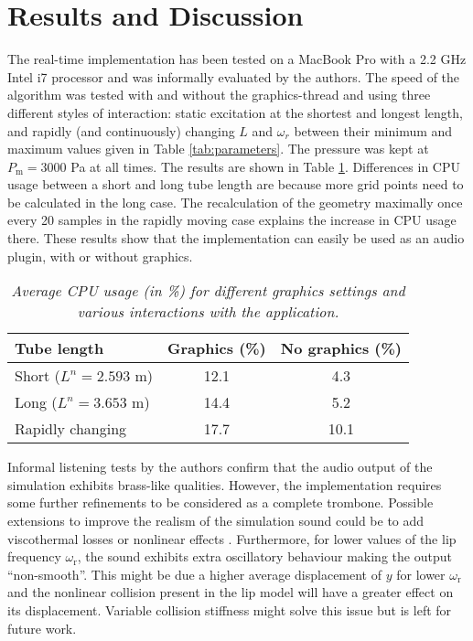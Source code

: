 \section{Results and Discussion}\label{sec:resDisc}
The real-time implementation has been tested on a MacBook Pro with a 2.2 GHz Intel i7 processor and was informally evaluated by the authors. The speed of the algorithm was tested with and without the graphics-thread and using three different styles of interaction: static excitation at the shortest and longest length, and rapidly (and continuously) changing $L$ and $\omega_r$ between their minimum and maximum values given in Table \ref{tab:parameters}. The pressure was kept at $P_\text{m} = 3000$ Pa at all times. The results are shown in Table \ref{tab:CPU}. Differences in CPU usage between a short and long tube length are because more grid points need to be calculated in the long case. The recalculation of the geometry maximally once every 20 samples in the rapidly moving case explains the increase in CPU usage there. %
These results show that the implementation can easily be used as an audio plugin, with or without graphics.
\begin{table}[ht]
    \small
    \begin{center}
    \caption{\it Average CPU usage (in \%) for different graphics settings and various interactions with the application. \label{tab:CPU}}
    \begin{tabular}{|l|c|c|}
        \hline
        Tube length & Graphics (\%) & No graphics (\%)\\\hline
        Short ($L^n = 2.593$ m) & 12.1 & 4.3\\
        Long ($L^n = 3.653$ m) & 14.4 & 5.2 
        \\
        Rapidly changing & 17.7 & 10.1\\\hline    \end{tabular}
    \end{center}
\end{table}

Informal listening tests by the authors confirm that the audio output of the simulation exhibits brass-like qualities. However, the implementation requires some further refinements to be considered as a complete trombone. Possible extensions to improve the realism of the simulation sound could be to add viscothermal losses \cite{Harrison2016} or nonlinear effects \cite{msallam1997physical}. Furthermore, for lower values of the lip frequency $\omega_\text{r}$, the sound exhibits extra oscillatory behaviour making the output ``non-smooth''. This might be due a higher average displacement of $y$ for lower $\omega_\text{r}$ and the nonlinear collision present in the lip model will have a greater effect on its displacement. Variable collision stiffness might solve this issue but is left for future work.

